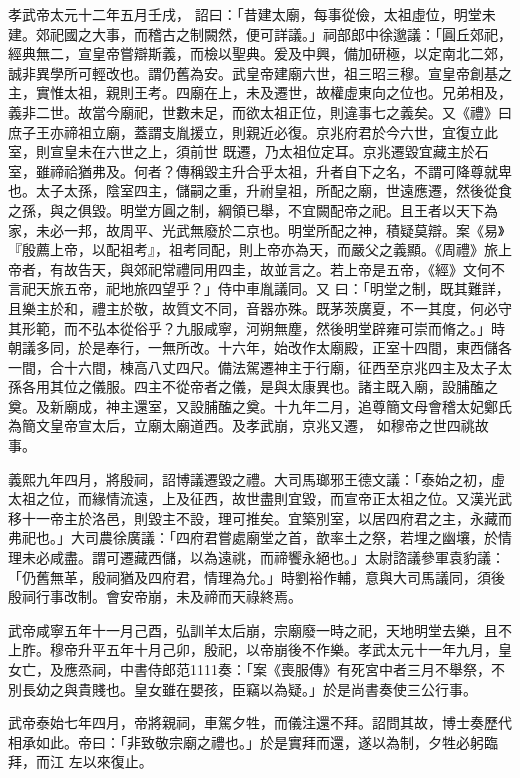 \begin{pinyinscope}
 孝武帝太元十二年五月壬戌，
 詔曰：「昔建太廟，每事從儉，太祖虛位，明堂未建。郊祀國之大事，而稽古之制闕然，便可詳議。」祠部郎中徐邈議：「圓丘郊祀，經典無二，宣皇帝嘗辯斯義，而檢以聖典。爰及中興，備加研極，以定南北二郊，誠非異學所可輕改也。謂仍舊為安。武皇帝建廟六世，祖三昭三穆。宣皇帝創基之主，實惟太祖，親則王考。四廟在上，未及遷世，故權虛東向之位也。兄弟相及，義非二世。故當今廟祀，世數未足，而欲太祖正位，則違事七之義矣。又《禮》曰庶子王亦禘祖立廟，蓋謂支胤援立，則親近必復。京兆府君於今六世，宜復立此室，則宣皇未在六世之上，須前世
 既遷，乃太祖位定耳。京兆遷毀宜藏主於石室，雖禘祫猶弗及。何者？傳稱毀主升合乎太祖，升者自下之名，不謂可降尊就卑也。太子太孫，陰室四主，儲嗣之重，升祔皇祖，所配之廟，世遠應遷，然後從食之孫，與之俱毀。明堂方圓之制，綱領已舉，不宜闕配帝之祀。且王者以天下為家，未必一邦，故周平、光武無廢於二京也。明堂所配之神，積疑莫辯。案《易》『殷薦上帝，以配祖考』，祖考同配，則上帝亦為天，而嚴父之義顯。《周禮》旅上帝者，有故告天，與郊祀常禮同用四圭，故並言之。若上帝是五帝，《經》文何不言祀天旅五帝，祀地旅四望乎？」侍中車胤議同。又
 曰：「明堂之制，既其難詳，且樂主於和，禮主於敬，故質文不同，音器亦殊。既茅茨廣夏，不一其度，何必守其形範，而不弘本從俗乎？九服咸寧，河朔無塵，然後明堂辟雍可崇而脩之。」時朝議多同，於是奉行，一無所改。十六年，始改作太廟殿，正室十四間，東西儲各一間，合十六間，棟高八丈四尺。備法駕遷神主于行廟，征西至京兆四主及太子太孫各用其位之儀服。四主不從帝者之儀，是與太康異也。諸主既入廟，設脯醢之奠。及新廟成，神主還室，又設脯醢之奠。十九年二月，追尊簡文母會稽太妃鄭氏為簡文皇帝宣太后，立廟太廟道西。及孝武崩，京兆又遷，
 如穆帝之世四祧故事。



 義熙九年四月，將殷祠，詔博議遷毀之禮。大司馬瑯邪王德文議：「泰始之初，虛太祖之位，而緣情流遠，上及征西，故世盡則宜毀，而宣帝正太祖之位。又漢光武移十一帝主於洛邑，則毀主不設，理可推矣。宜築別室，以居四府君之主，永藏而弗祀也。」大司農徐廣議：「四府君嘗處廟堂之首，歆率土之祭，若埋之幽壤，於情理未必咸盡。謂可遷藏西儲，以為遠祧，而禘饗永絕也。」太尉諮議參軍袁豹議：「仍舊無革，殷祠猶及四府君，情理為允。」時劉裕作輔，意與大司馬議同，須後殷祠行事改制。會安帝崩，未及禘而天祿終焉。



 武帝咸寧五年十一月己酉，弘訓羊太后崩，宗廟廢一時之祀，天地明堂去樂，且不上胙。穆帝升平五年十月己卯，殷祀，以帝崩後不作樂。孝武太元十一年九月，皇女亡，及應烝祠，中書侍郎范1111奏：「案《喪服傳》有死宮中者三月不舉祭，不別長幼之與貴賤也。皇女雖在嬰孩，臣竊以為疑。」於是尚書奏使三公行事。



 武帝泰始七年四月，帝將親祠，車駕夕牲，而儀注還不拜。詔問其故，博士奏歷代相承如此。帝曰：「非致敬宗廟之禮也。」於是實拜而還，遂以為制，夕牲必躬臨拜，而江
 左以來復止。




\end{pinyinscope}
